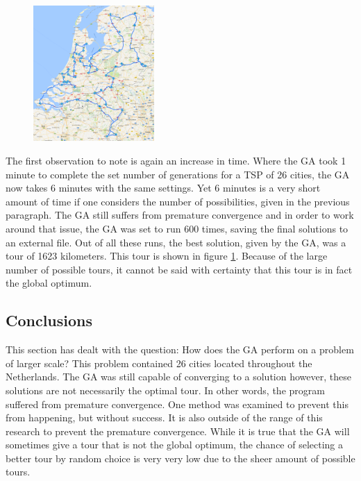 \begin{figure}
	\vspace{-0.4cm}
	\centering
		\includegraphics[width=0.41\textwidth]{1623tour}	
	\label{1623tour}
\end{figure}

\par
The first observation to note is again an increase in time. Where the GA took 1 minute to complete the set number of generations for a TSP of 26 cities, the GA now takes 6 minutes with the same settings. Yet 6 minutes is a very short amount of time if one considers the number of possibilities, given in the previous paragraph. The GA still suffers from premature convergence and in order to work around that issue, the GA was set to run 600 times, saving the final solutions to an external file. Out of all these runs, the best solution, given by the GA, was a tour of 1623 kilometers. This tour is shown in figure \ref{1623tour}. Because of the large number of possible tours, it cannot be said with certainty that this tour is in fact the global optimum. 


\subsection{Conclusions}
\par
This section has dealt with the question: How does the GA perform on a problem of larger scale? This problem contained 26 cities located throughout the Netherlands. The GA was still capable of converging to a solution however, these solutions are not necessarily the optimal tour. In other words, the program suffered from premature convergence. One method was examined to prevent this from happening, but without success. It is also outside of the range of this research to prevent the premature convergence. While it is true that the GA will sometimes give a tour that is not the global optimum, the chance of selecting a better tour by random choice is very very low due to the sheer amount of possible tours. 

